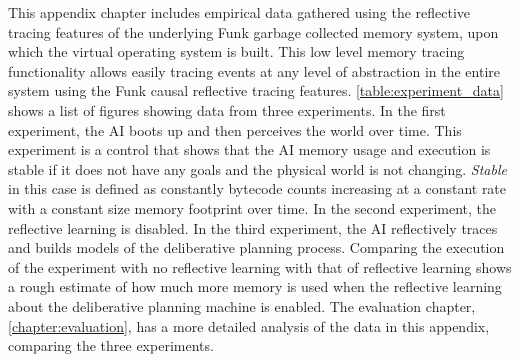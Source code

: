 This appendix chapter includes empirical data gathered using the
reflective tracing features of the underlying Funk garbage collected
memory system, upon which the virtual operating system is built.  This
low level memory tracing functionality allows easily tracing events at
any level of abstraction in the entire system using the Funk causal
reflective tracing features.  \autoref{table:experiment_data} shows a
list of figures showing data from three experiments.  In the first
experiment, the AI boots up and then perceives the world over time.
This experiment is a control that shows that the AI memory usage and
execution is stable if it does not have any goals and the physical
world is not changing.  \emph{Stable} in this case is defined as
constantly bytecode counts increasing at a constant rate with a
constant size memory footprint over time.  In the second experiment,
the reflective learning is disabled.  In the third experiment, the AI
reflectively traces and builds models of the deliberative planning
process.  Comparing the execution of the experiment with no reflective
learning with that of reflective learning shows a rough estimate of
how much more memory is used when the reflective learning about the
deliberative planning machine is enabled.  The evaluation chapter,
\autoref{chapter:evaluation}, has a more detailed analysis of the data
in this appendix, comparing the three experiments.

